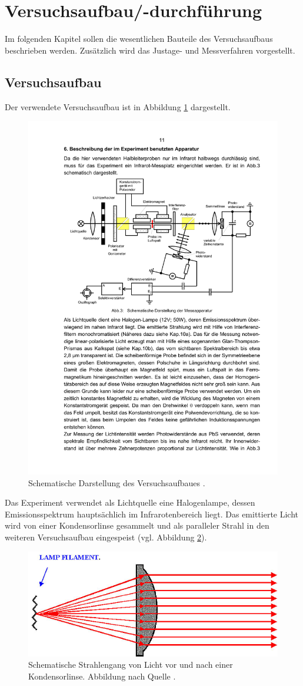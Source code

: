 \section{Versuchsaufbau/-durchführung}
Im folgenden Kapitel sollen die wesentlichen Bauteile des Versuchsaufbaus beschrieben
werden. Zusätzlich wird das Justage- und Messverfahren vorgestellt.

\subsection{Versuchsaufbau}
\FloatBarrier
Der verwendete Versuchsaufbau ist in Abbildung \ref{fig:aufbau} dargestellt.
\begin{figure}
\centering
\includegraphics[width=0.7\linewidth]{./content/images/aufbau.pdf}
\caption{Schematische Darstellung des Versuchsaufbaues \cite{anleitungv46}.}
\label{fig:aufbau}
\end{figure}
Das Experiment verwendet als Lichtquelle eine Halogenlampe, dessen Emissionsspektrum
hauptsächlich im Infrarotenbereich liegt. Das emittierte Licht wird von einer
Kondensorlinse gesammelt und als paralleler Strahl in den weiteren Versuchsaufbau
eingespeist (vgl. Abbildung \ref{fig:kondensorlinse}).
\begin{figure}
\centering
\includegraphics[width=0.45\linewidth]{./content/images/condensor.JPG}
\caption{Schematische Strahlengang von Licht vor und nach einer Kondensorlinse.
Abbildung nach Quelle \cite{kondensorlinse}.}
\label{fig:kondensorlinse}
\end{figure}
